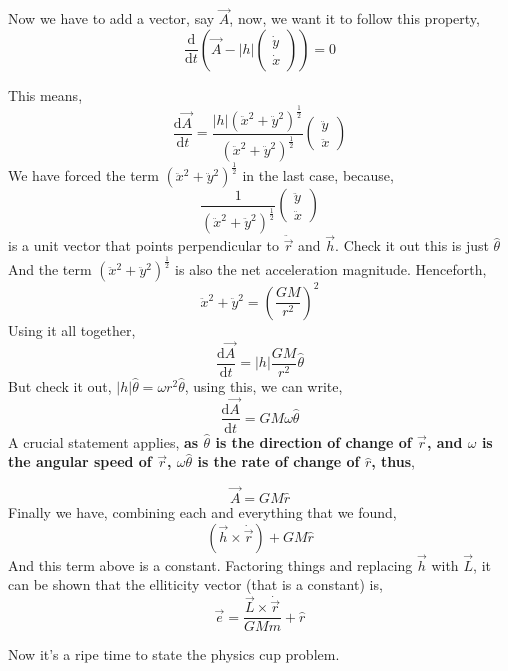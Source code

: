 \documentclass[11pt,a4paper]{article}
\begin{document}
Now we have to add a vector, say $\vec{A}$, now, we want it to follow this property,
\[ 
    \frac{\mathrm{d} }{\mathrm{d} t} \left( \vec{A} - |h| \begin{pmatrix}
    \dot{y}\\ \dot{x} 
    \end{pmatrix} 
     \right) = 0
\]

This means,
\[ 
    \frac{\mathrm{d} \vec{A}}{\mathrm{d} t} = \frac{|h| \left( \ddot{x}^2 + \ddot{y}^2 \right)  ^{\frac{1}{2}} }{ (\ddot{x}^2 + \ddot{y}^2   )^{\frac{1}{2}} }   \begin{pmatrix}
    \ddot{y} \\ \ddot{x} 
    \end{pmatrix} 
\]
We have forced the term $\left( \ddot{x}^2 + \ddot{y}^2 \right)  ^{\frac{1}{2}} $ in the last case, because,
\[ 
    \frac{1}{\left( \ddot{x}^2 + \ddot{y}^2 \right)  ^{\frac{1}{2}} } \begin{pmatrix}
    \ddot{y} \\ \ddot{x} 
    \end{pmatrix} 
\]
is a unit vector that points perpendicular to $ \ddot{\vec{r}}$ and $\vec{h}$. Check it out this is just $\hat{\theta}$ And the term $(\ddot{x}^2 + \ddot{y}^2) ^{\frac{1}{2}}$  is also the net acceleration magnitude. Henceforth,
\[ 
    \ddot{x}^2 + \ddot{y}^2 = \left( \frac{GM}{r^2} \right) ^2
\]
Using it all together,
\[ 
\frac{\mathrm{d} \vec{A}}{\mathrm{d} t} = |h| \frac{GM}{r^2} \hat{\theta}
\]
But check it out, $|h| \hat{\theta} = \omega r^2 \hat{\theta}$, using this, we can write,
\[ 
\frac{\mathrm{d} \vec{A}}{\mathrm{d} t} = GM \omega \hat{\theta}
\]
A crucial statement applies, \textbf{as $\hat{\theta}$ is the direction of change of $\vec{r}$, and $\omega$ is the angular speed of $\vec{r}$, $\omega \hat{ \theta}$ is the rate of change of $\hat{r}$, thus},

\[ 
\vec{A} = GM \hat{r}
\]
Finally we have, combining each and everything that we found,
\[
    \left( \vec{h} \times  \dot{ \vec{r} }  \right) + GM \hat{r}        
\]
And this term above is a constant. Factoring things and replacing $\vec{h}$ with $\vec{L}$, it can be shown that the elliticity vector (that is a constant) is,
\[ 
    \boxed{ \vec{e} = \frac{\vec{L} \times  \dot{\vec{r}} }{GMm} + \hat{r} }
\]


Now it's a ripe time to state the physics cup problem. 
\end{document}
